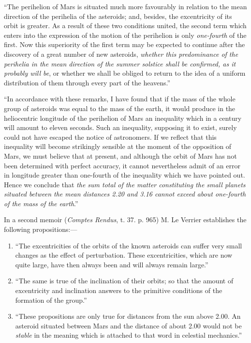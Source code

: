 \documentclass[a4paper, 12pt, oneside]{article}
\begin{document}
``The perihelion of Mars is situated much more favourably in relation to the mean direction of the perihelia of the asteroids; and, besides, the excentricity of its orbit is greater. As a result of these two conditions united, the second term which enters into the expression of the motion of the perihelion is only \emph{one-fourth} of the first. Now this superiority of the first term may be expected to continue after the discovery of a great number of new asteroids, \emph{whether this predominance of the perihelia in the mean direction of the summer solstice shall be confirmed, as it probably will be}, or whether we shall be obliged to return to the idea of a uniform distribution of them through every part of the heavens.''

``In accordance with these remarks, I have found that if the mass of the whole group of asteroids was equal to the mass of the earth, it would produce in the heliocentric longitude of the perihelion of Mars an inequality which in a century will amount to eleven seconds. Such an inequality, supposing it to exist, surely could not have escaped the notice of astronomers. If we reflect that this inequality will become strikingly sensible at the moment of the opposition of Mars, we must believe that at present, and although the orbit of Mars has not been determined with perfect accuracy, it cannot nevertheless admit of an error in longitude greater than one-fourth of the inequality which we have pointed out. Hence we conclude that \emph{the sum total of the matter constituting the small planets situated between the mean distances 2.20 and 3.16 cannot exceed about one-fourth of the mass of the earth}.''

In a second memoir (\emph{Comptes Rendus}, t. 37. p. 965) M. Le Verrier establishes the following propositions:---
\begin{enumerate}
    \item ``The excentricities of the orbits of the known asteroids can suffer very small changes as the effect of perturbation. These excentricities, which are now quite large, have then always been and will always remain large.''
    \item ``The same is true of the inclination of their orbits; so that the amount of excentricity and inclination answers to the primitive conditions of the formation of the group.''
    \item ``These propositions are only true for distances from the sun above 2.00. An asteroid situated between Mars and the distance of about 2.00 would not be \emph{stable} in the meaning which is attached to that word in celestial mechanics.''
\end{enumerate}
\end{document}
